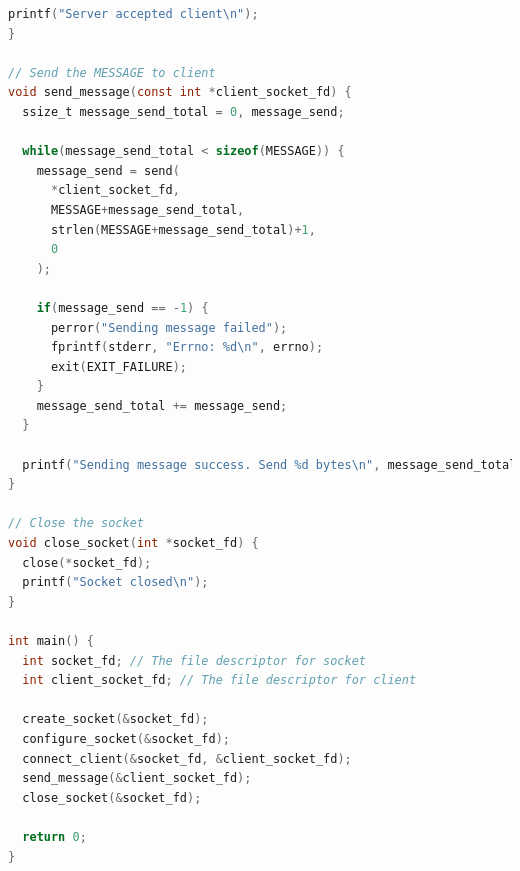 \begin{lstlisting}[language=C]
  printf("Server accepted client\n");
}

// Send the MESSAGE to client
void send_message(const int *client_socket_fd) {
  ssize_t message_send_total = 0, message_send;

  while(message_send_total < sizeof(MESSAGE)) {
    message_send = send(
      *client_socket_fd, 
      MESSAGE+message_send_total, 
      strlen(MESSAGE+message_send_total)+1, 
      0
    );

    if(message_send == -1) {
      perror("Sending message failed");
      fprintf(stderr, "Errno: %d\n", errno);
      exit(EXIT_FAILURE);
    }
    message_send_total += message_send;
  }

  printf("Sending message success. Send %d bytes\n", message_send_total);
}

// Close the socket
void close_socket(int *socket_fd) {
  close(*socket_fd);
  printf("Socket closed\n");
}

int main() {
  int socket_fd; // The file descriptor for socket
  int client_socket_fd; // The file descriptor for client

  create_socket(&socket_fd);
  configure_socket(&socket_fd);
  connect_client(&socket_fd, &client_socket_fd);
  send_message(&client_socket_fd);
  close_socket(&socket_fd);
  
  return 0;
}
\end{lstlisting}


